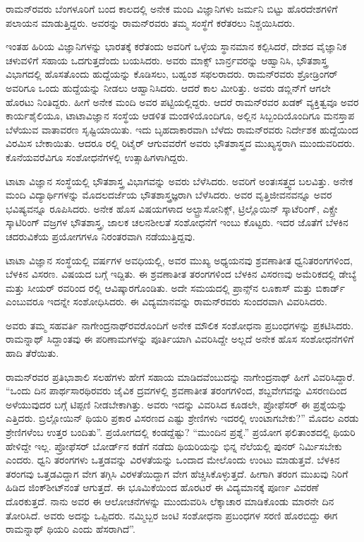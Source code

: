 ರಾಮನ್‍ರವರು ಬೆಂಗಳೂರಿಗೆ ಬಂದ ಕಾಲದಲ್ಲಿ ಅನೇಕ ಮಂದಿ ವಿಜ್ಞಾನಿಗಳು ಜರ್ಮನಿ ಬಿಟ್ಟು ಹೊರದೇಶಗಳಿಗೆ ಪಲಾಯನ ಮಾಡುತ್ತಿದ್ದರು. ಅವರನ್ನು ರಾಮನ್‍ರವರು ತಮ್ಮ ಸಂಸ್ಥೆಗೆ ಕರೆತರಲು ನಿಶ್ಚಯಿಸಿದರು.

ಇಂತಹ ಹಿರಿಯ ವಿಜ್ಞಾನಿಗಳನ್ನು ಭಾರತಕ್ಕೆ ಕರೆತಂದು ಅವರಿಗೆ ಒಳ್ಳೆಯ ಸ್ಥಾನಮಾನ ಕಲ್ಪಿಸಿದರೆ, ದೇಶದ ವೈಜ್ಞಾನಿಕ ಚಳುವಳಿಗೆ ಸಹಾಯ ಒದಗುತ್ತದೆಂದು ಬಯಸಿದರು. ಅವರು ಮಾಕ್ಸ್ ಬಾರ್ನ್\break ರವರನ್ನು ಆಹ್ವಾನಿಸಿ, ಭೌತಶಾಸ್ತ್ರ ವಿಭಾಗದಲ್ಲಿ ಹೊಸತೊಂದು ಹುದ್ದೆಯನ್ನು ಕೊಡಿಸಲು, ಬಹ್ವಂಶ ಸಫಲರಾದರು. ರಾಮನ್‍ರವರು ಶ್ರೋಡ್ರಿಂಗರ್ ಅವರಿಗೂ ಒಂದು ಹುದ್ದೆಯನ್ನು ನೀಡಲು ಆಹ್ವಾನಿಸಿದರು. ಆದರೆ ಕಾಲ ಮೀರಿತ್ತು. ಅವರು ಡಬ್ಲಿನ್‍ಗೆ ಆಗಲೇ ಹೊರಟು ನಿಂತಿದ್ದರು. ಹೀಗೆ ಅನೇಕ ಮಂದಿ ಅವರ ಪಟ್ಟಿಯಲ್ಲಿದ್ದರು. ಆದರೆ ರಾಮನ್‍ರವರ ಖಡಕ್ ವ್ಯಕ್ತಿತ್ವವೂ ಅವರ ಕಾರ್ಯಶೈಲಿಯೂ, ಟಾಟಾವಿಜ್ಞಾನ ಸಂಸ್ಥೆಯ ಆಡಳಿತ ಮಂಡಳಿಯೊಂದಿಗೂ, ಅಲ್ಲಿನ ಸಿಬ್ಬಂದಿಯೊಂದಿಗೂ ಮನಸ್ತಾಪ ಬೆಳೆಯುವ ವಾತಾವರಣ ಸೃಷ್ಟಿಯಾಯಿತು. ಇದು ಬೃಹದಾಕಾರವಾಗಿ ಬೆಳೆದು ರಾಮನ್‍ರವರು ನಿರ್ದೇಶಕ ಹುದ್ದೆಯಿಂದ ವಿರಮಿಸ ಬೇಕಾಯಿತು. ಆದರೂ ರಲ್ಲಿ ರಿಟೈರ್ ಆಗುವವರೆಗೆ ಅವರು ಭೌತಶಾಸ್ತ್ರದ ಮುಖ್ಯಸ್ಥರಾಗಿ ಮುಂದುವರಿದರು. ಕೊನೆಯವರೆವಿಗೂ ಸಂಶೋಧನೆಗಳಲ್ಲಿ ಉತ್ಸಾಹಿಗಳಾಗಿದ್ದರು.

ಟಾಟಾ ವಿಜ್ಞಾನ ಸಂಸ್ಥೆಯಲ್ಲಿ ಭೌತಶಾಸ್ತ್ರ ವಿಭಾಗವನ್ನು ಅವರು ಬೆಳೆಸಿದರು. ಅವರಿಗೆ ಅಂತಃಸತ್ತ್ವದ ಬಲವಿತ್ತು. ಅನೇಕ ಮಂದಿ ವಿದ್ಯಾರ್ಥಿಗಳನ್ನು ಮೊದಲದರ್ಜೆಯ ಭೌತಶಾಸ್ತ್ರಜ್ಞರಾಗಿ ಬೆಳೆಸಿದರು. ಅವರ ವೃತ್ತಿಜೀವನವನ್ನೂ ಅವರ ಭವಿಷ್ಯವನ್ನೂ ರೂಪಿಸಿದರು. ಅನೇಕ ಹೊಸ ವಿಷಯಗಳಾದ ಅಲ್ಟ್ರಾಸೋನಿಕ್ಸ್, ಟ್ರಿಲ್ಲೊಯಿನ್ ಸ್ಕಾಟೆರಿಂಗ್, ಎಕ್ಸ್\enginline{-}ರೇ ಸ್ಕಾಟಿರಿಂಗ್ ವಜ್ರಗಳ ಭೌತಶಾಸ್ತ್ರ, ಜಾಲಕ ಚಲನಶೀಲತೆ ಸಂಶೋಧನೆಗೆ ಇಂಬು ಕೊಟ್ಟರು. ಇದರ ಜೊತೆಗೆ ಬೆಳಕಿನ ಚದರುವಿಕೆಯ ಪ್ರಯೋಗಗಳೂ ನಿರಂತರವಾಗಿ ನಡೆಯುತ್ತಿದ್ದವು.

ಟಾಟಾ ವಿಜ್ಞಾನ ಸಂಸ್ಥೆಯಲ್ಲಿ  ವರ್ಷಗಳ ಅವಧಿಯಲ್ಲಿ, ಅವರ ಮುಖ್ಯ ಅಧ್ಯಯನವು ಶ್ರವಣಾತೀತ ಧ್ವನಿತರಂಗಗಳಿಂದ, ಬೆಳಕಿನ ವಿಸರಣ. ವಿಷಯದ ಬಗ್ಗೆ ಇದ್ದಿತು. ಈ ಶ್ರವಣಾತೀತ ತರಂಗಗಳಿಂದ ಬೆಳಕಿನ ವಿಸರಣವು ಅಮೆರಿಕದಲ್ಲಿ ಡೇಬ್ಯೆ ಮತ್ತು ಸೀಯರ್ ರವರಿಂದ ರಲ್ಲಿ ಆವಿಷ್ಕಾರಗೊಂಡಿತು. ಅದೇ ಸಮಯದಲ್ಲಿ ಪ್ರಾನ್ಸ್‌ನ ಲೂಕಾಸ್ ಮತ್ತು ಬಿಕಾರ್ಡ್ ಎಂಬುವರೂ ಇದನ್ನೇ ಸಂಶೋಧಿಸಿದರು. ಈ ವಿದ್ಯಮಾನವನ್ನು ರಾಮನ್‍ರವರು ಸುಂದರವಾಗಿ ವಿವರಿಸಿದರು.

ಅವರು ತಮ್ಮ ಸಹವರ್ತಿ ನಾಗೇಂದ್ರನಾಥ್‍ರವರೊಂದಿಗೆ ಅನೇಕ ಮೌಲಿಕ ಸಂಶೋಧನಾ ಪ್ರಬಂಧಗಳನ್ನು ಪ್ರಕಟಿಸಿದರು. ರಾಮನ್\enginline{-}ನಾಥ್ ಸಿದ್ದಾಂತವು ಈ ಪರಿಣಾಮಗಳನ್ನು ಪೂರ್ತಿಯಾಗಿ ವಿವರಿಸಿದ್ದೇ ಅಲ್ಲದೆ ಅನೇಕ ಹೊಸ ಸಂಶೋಧನೆಗಳಿಗೆ ಹಾದಿ ತೆರೆಯಿತು.

ರಾಮನ್‍ರವರ ಪ್ರತಿಭಾಶಾಲಿ ಸಲಹೆಗಳು ಹೇಗೆ ಸಹಾಯ ಮಾಡಿದವೆಂಬುದನ್ನು ನಾಗೇಂದ್ರನಾಥ್ ಹೀಗೆ ವಿವರಿಸಿದ್ದಾರೆ. \enginline{-}“ಒಂದು ದಿನ ಪಾರ್ಥಸಾರಥಿರವರು ಜೈವಿಕ ದ್ರವಗಳಲ್ಲಿ ಶ್ರವಣಾತೀತ ತರಂಗಗಳಿಂದ, ಶಬ್ದವೇಗವನ್ನು ವಿಸರಣದಿಂದ ಅಳೆಯುವುದರ ಬಗ್ಗೆ ಟಿಪ್ಪಣಿ ನೀಡಬೇಕಾಗಿತ್ತು. ಅವರು ಇದನ್ನು ವಿವರಿಸಿದ ಕೂಡಲೇ, ಪ್ರೋಫೆಸರ್ ಈ ಪ್ರಶ್ನೆಯನ್ನು ಎತ್ತಿದರು. ಬ್ರಿಲ್ಲೋಯಿನ್ ಥಿಯರಿ ಪ್ರಕಾರ ವಿಸರಣದ ಎಷ್ಟು ಶ್ರೇಣಿಗಳು ಇದರಲ್ಲಿ ಉಂಟಾಗಬೇಕು?” ಮೊದಲ ಎರಡು ಶ್ರೇಣಿಗಳೆಂಬ ಉತ್ತರ ಬಂದಿತು”. ಪ್ರಯೋಗದಲ್ಲಿ ಕಂಡದ್ದೆಷ್ಟು? “ಮುಂದಿನ ಪ್ರಶ್ನೆ.” ಪ್ರಯೋಗ ಫಲಿತಾಂಶದಲ್ಲಿ ಥಿಯರಿ ಹೇಳಿದ್ದೇ ಇಲ್ಲ. ಪ್ರೋಫೆಸರ್ ಬೋರ್ಡ್‌ನ ಕಡೆಗೆ ನಡೆದು ಥಿಯರಿಯನ್ನು ಭಿನ್ನ ನೆಲೆಯಲ್ಲಿ ಪುನರ್ ನಿರ್ಮಿಸಬೇಕು ಎಂದರು. ಧ್ವನಿ ತರಂಗಗಳು ಒತ್ತಡವನ್ನು ವಿರಳತೆಯನ್ನು ಒಂದಾದ ಮೇಲೊಂದು ಉಂಟು ಮಾಡುತ್ತವೆ. ಬೆಳಕಿನ ತರಂಗವು ಒತ್ತಡವಿದ್ದಾಗ ವೇಗ ತಗ್ಗಿಸಿ ವಿರಳತೆಯಿದ್ದಾಗ ವೇಗ ಹೆಚ್ಚಿಸಿಕೊಳ್ಳುತ್ತದೆ. ಹೀಗಾಗಿ ತರಂಗ ಮುಖವು ನಿರಿಗೆ ಹಿಡಿದ ಜಿಂಕ್‍ಶೀಟ್‍ನಂತೆ ಆಗುತ್ತದೆ. ಈ ಭೂಮಿಕೆಯಿಂದ ಹೊರಟರೆ ಈ ವಿದ್ಯಮಾನಕ್ಕೆ ಪೂರ್ಣ ವಿವರಣೆ ದೊರಕುತ್ತದೆ. ನಾನು ಅವರ ಈ ಆಲೋಚನೆಗಳನ್ನು ಮುಂದುವರಿಸಿ ಲೆಕ್ಕಾಚಾರ ಮಾಡಿಕೊಂಡು ಮಾರನೇ ದಿನ ತೋರಿಸಿದೆ. ಅವರು ಅದನ್ನು ಒಪ್ಪಿದರು. ನಮ್ಮಿಬ್ಬರ ಜಂಟಿ ಸಂಶೋಧನಾ ಪ್ರಬಂಧಗಳ ಸರಣಿ ಹೊರಬಿದ್ದು ಈಗ ರಾಮನ್\enginline{-}ನಾಥ್ ಥಿಯರಿ ಎಂದು ಹೆಸರಾಗಿದೆ”.

